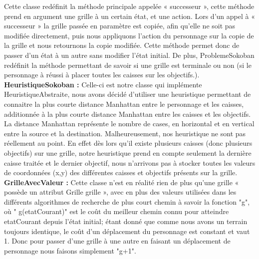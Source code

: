 \documentclass[a4paper,12pt]{article} %
\begin{document}
\newline\newline
Cette classe redéfinit la méthode principale appelée « successeur », cette méthode prend en argument une grille à un certain état, et une action. 
\newline\newline
Lors d’un appel à « successeur » la grille passée en paramètre est copiée, afin qu'elle ne soit pas modifiée directement, puis nous appliquons l’action du personnage sur la copie de la grille et nous retournons la copie modifiée. Cette méthode permet donc de passer d’un état à un autre sans modifier l’état initial.
\newline 
De plus, ProblemeSokoban redéfinit la méthode permettant de savoir si une grille est terminale ou non (si le personnage à réussi à placer toutes les caisses sur les objectifs.).
\newline\newline
\noindent
\textbf{HeuristiqueSokoban :}
\newline\newline
Celle-ci est notre classe qui implémente HeuristiqueAbstraite, nous avons décidé d’utiliser une heuristique permettant de connaitre la plus courte distance Manhattan entre le personnage et les caisses, additionnée à la plus courte distance Manhattan entre les caisses et les objectifs. 
\newline\newline
La distance Manhattan représente le nombre de cases, en horizontal et en vertical entre la source et la destination. 
\newline
Malheureusement, nos heuristique ne sont pas réellement au point. 
\newline\newline
En effet dès lors qu’il existe plusieurs caisses (donc plusieurs objectifs) sur une grille, notre heuristique prend en compte seulement la dernière caisse traitée et le dernier objectif, nous n’arrivons pas à stocker toutes les valeurs de coordonnées (x,y) des différentes caisses et objectifs présents sur la grille.
\newpage 
\noindent
\textbf{GrilleAvecValeur :}
\newline\newline
Cette classe n’est en réalité rien de plus qu’une grille « possède un attribut Grille grille », avec en plus des valeurs utilisées dans les différents algorithmes de recherche de plus court chemin à savoir la fonction "g", où " g(etatCourant)" est le coût du meilleur chemin connu pour atteindre etatCourant depuis l'état initial; étant donné que comme nous avons un terrain toujours identique, le coût d’un déplacement du personnage est constant et vaut 1. Donc pour passer d’une grille à une autre en faisant un déplacement de personnage nous faisons simplement "g+1". 
\end{document}

